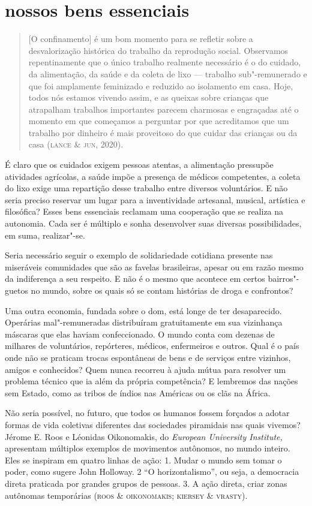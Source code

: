\section{nossos bens essenciais}


\begin{quote}
{[}O confinamento{]} é um bom momento para se refletir sobre a
desvalorização histórica do trabalho da reprodução social. Observamos
repentinamente que o único trabalho realmente necessário é o do cuidado,
da alimentação, da saúde e da coleta de lixo --- trabalho sub"-remunerado
e que foi amplamente feminizado e reduzido ao isolamento em casa. Hoje,
todos nós estamos vivendo assim, e as queixas sobre crianças que
atrapalham trabalhos importantes parecem charmosas e engraçadas até o
momento em que começamos a perguntar por que acreditamos que um trabalho
por dinheiro é mais proveitoso do que cuidar das crianças ou da casa
(\textsc{lance} \& \textsc{jun}, 2020).
\end{quote}

É claro que os cuidados exigem pessoas atentas, a alimentação pressupõe
atividades agrícolas, a saúde impõe a presença de médicos competentes, a
coleta do lixo exige uma repartição desse trabalho entre diversos
voluntários. E não seria preciso reservar um lugar para a inventividade
artesanal, musical, artística e filosófica? Esses bens essenciais
reclamam uma cooperação que se realiza na autonomia. Cada ser é múltiplo
e sonha desenvolver suas diversas possibilidades, em suma, realizar"-se.

Seria necessário seguir o exemplo de solidariedade cotidiana presente
nas miseráveis comunidades que são as favelas brasileiras, apesar ou em
razão mesmo da indiferença a seu respeito. E não é o mesmo que acontece
em certos bairros"-guetos no mundo, sobre os quais só se contam histórias
de droga e confrontos?

Uma outra economia, fundada sobre o dom, está longe de ter desaparecido.
Operárias mal"-remuneradas distribuíram gratuitamente em sua vizinhança
máscaras que elas haviam confeccionado. O mundo conta com dezenas de
milhares de voluntários, repórteres, médicos, enfermeiros e outros. Qual
é o país onde não se praticam trocas espontâneas de bens e de serviços
entre vizinhos, amigos e conhecidos? Quem nunca recorreu à ajuda mútua
para resolver um problema técnico que ia além da própria competência? E
lembremos das nações sem Estado, como as tribos de índios nas Américas
ou os clãs na África.

Não seria possível, no futuro, que todos os humanos fossem forçados a
adotar formas de vida coletivas diferentes das sociedades piramidais nas
quais vivemos? Jérome E. Roos e Léonidas Oikonomakis, do \emph{European
University Institute,} apresentam múltiplos exemplos de movimentos
autônomos, no mundo inteiro. Eles se inspiram em quatro linhas de ação:
1. Mudar o mundo sem tomar o poder, como sugere John Holloway. 2 ``O
horizontalismo'', ou seja, a democracia direta praticada por grandes
grupos de pessoas. 3. A ação direta, criar zonas autônomas temporárias
(\textsc{roos} \& \textsc{oikonomakis}; \textsc{kiersey} \& \textsc{vrasty}).

